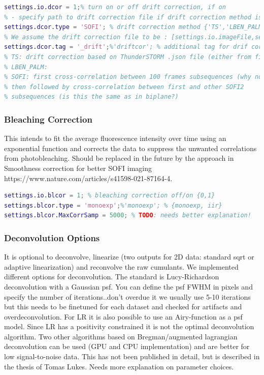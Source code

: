 \documentclass[final]{scrartcl}
\begin{document}
\begin{lstlisting}[language=Matlab]
% Drift correction settings TODO: please check explanation and complete it!
settings.io.dcor = 1;% turn on or off drift correction, if on
% - specify path to drift correction file if drift correction method is other than SOFI
settings.dcor.type = 'SOFI'; % drift correction method {'TS','LBEN_PALM','SOFI'}
% We assume the drift correction file to be : [settings.io.imageFile,settings.dcor.tag]
settings.dcor.tag = '_drift';%'driftcor'; % additional tag for drif corr. file {_drift_corr, drift,driftcor}
% TS: drift correction based on ThunderSTORM .json file (either from fiducial markers or cross-correlation)
% LBEN_PALM:
% SOFI: first cross-correlation between 100 frames subsequences (why not variable?) and first 100 frames, performed for mean of stack??
% then followed by cross-correlation between first and other SOFI2
% subsequences (is this the same as in biplane?)
\end{lstlisting}

\subsubsection*{Bleaching Correction}
This intends to fit the average fluorescence intensity over time using an exponential function and corrects the data to suppress the unwanted correlations from photobleaching. Should be replaced in the future by the approach in Smoothness correction for better SOFI imaging https://www.nature.com/articles/s41598-021-87164-4.

\begin{lstlisting}[language=Matlab]
% Bleaching correction settings
settings.io.blcor = 1; % bleaching correction off/on {0,1}
settings.blcor.type = 'monoexp';%'monoexp'; % {monoexp, iir}
settings.blcor.MaxCorrSamp = 5000; % TODO: needs better explanation!
\end{lstlisting}

\subsubsection*{Deconvolution Options}
It is optional to deconvolve, linearize (two outputs for 2D data: standard sqrt or adaptive linearization) and reconvolve the raw cumulants.
We implemented different options for deconvolution. The standard is Lucy-Richardson deconvolution with a Gaussian psf. You can define the psf FWHM in pixels and specify the number of iterations..don't overdue it we usually use 5-10 iterations but this needs to be finetuned for each dataset and checked for artifacts and overdeconvolution. For LR it is also possible to use an Airy-function as a psf model. Since LR has a positivity constrained it is not the optimal deconvolution algorithm. Two other algorithms based on Bregman/augmented lagrangian deconvolution can be used (GPU and CPU implementation) and are better for low signal-to-noise data. This has not been published in detail, but is described in the thesis of Tomas Lukes. Needs more explanation on parameter choices.
\end{document}
